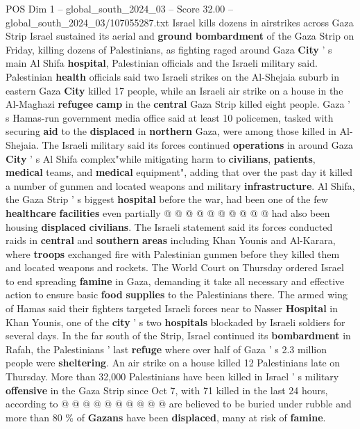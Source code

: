 \begin{textsample}{POS Dim 1 – global\_south\_2024\_03 – Score 32.00 – global\_south\_2024\_03/107055287.txt}  \label{ex:f1_pos_012}
Israel kills dozens in airstrikes across Gaza Strip Israel sustained its aerial and \textbf{ground} \textbf{bombardment} of the Gaza Strip on Friday, killing dozens of Palestinians, as fighting raged around Gaza \textbf{City} ' s main Al Shifa \textbf{hospital}, Palestinian officials and the Israeli military said.
Palestinian \textbf{health} officials said two Israeli strikes on the Al-Shejaia suburb in eastern Gaza \textbf{City} killed 17 people, while an Israeli air strike on a house in the Al-Maghazi \textbf{refugee} \textbf{camp} in the \textbf{central} Gaza Strip killed eight people.
Gaza ' s Hamas-run government media office said at least 10 policemen, tasked with securing \textbf{aid} to the \textbf{displaced} in \textbf{northern} Gaza, were among those killed in Al-Shejaia.
The Israeli military said its forces continued \textbf{operations} in around Gaza \textbf{City} ' s Al Shifa complex"while mitigating harm to \textbf{civilians}, \textbf{patients}, \textbf{medical} teams, and \textbf{medical} equipment", adding that over the past day it killed a number of gunmen and located weapons and military \textbf{infrastructure}.
Al Shifa, the Gaza Strip ' s biggest \textbf{hospital} before the war, had been one of the few \textbf{healthcare} \textbf{facilities} even partially @ @ @ @ @ @ @ @ @ @ had also been housing \textbf{displaced} \textbf{civilians}.
The Israeli statement said its forces conducted raids in \textbf{central} and \textbf{southern} \textbf{areas} including Khan Younis and Al-Karara, where \textbf{troops} exchanged fire with Palestinian gunmen before they killed them and located weapons and rockets.
The World Court on Thursday ordered Israel to end spreading \textbf{famine} in Gaza, demanding it take all necessary and effective action to ensure basic \textbf{food} \textbf{supplies} to the Palestinians there.
The armed wing of Hamas said their fighters targeted Israeli forces near to Nasser \textbf{Hospital} in Khan Younis, one of the \textbf{city} ' s two \textbf{hospitals} blockaded by Israeli soldiers for several days.
In the far south of the Strip, Israel continued its \textbf{bombardment} in Rafah, the Palestinians ' last \textbf{refuge} where over half of Gaza ' s 2.3 million people were \textbf{sheltering}.
An air strike on a house killed 12 Palestinians late on Thursday.
More than 32,000 Palestinians have been killed in Israel ' s military \textbf{offensive} in the Gaza Strip since Oct 7, with 71 killed in the last 24 hours, according to @ @ @ @ @ @ @ @ @ @ are believed to be buried under rubble and more than 80 \% of \textbf{Gazans} have been \textbf{displaced}, many at risk of \textbf{famine}.

\end{textsample}
